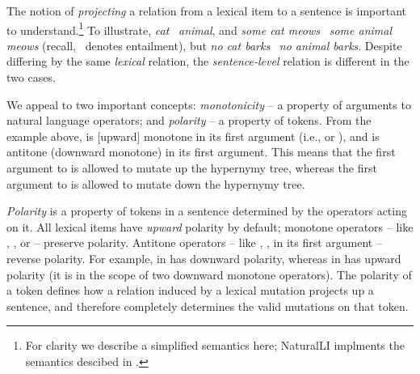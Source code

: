 %
%

The notion of \textit{projecting} a relation from a lexical item to
  a sentence is important to understand.\footnote{
    For clarity we describe a simplified semantics here; 
    NaturalLI implments the semantics descibed in 
    .
  }
To illustrate, \textit{cat} \forward\ \textit{animal},
  and \textit{some cat meows} \forward\ \textit{some animal meows}
  (recall, \forward\ denotes entailment),
  but
  \textit{no cat barks} \nforward\ \textit{no animal barks}.
Despite differing by the same \textit{lexical} relation,
  the \textit{sentence-level} relation is different in the two cases.

We appeal to two important concepts: \textit{monotonicity} -- a
  property of arguments to natural language operators;
  and \textit{polarity} -- a property of tokens.
From the example above,  is [upward] monotone in its first
  argument (i.e.,  or ), 
  and  is antitone (downward monotone) in its first argument.
This means that the first argument to  is allowed to mutate up the
  hypernymy tree, whereas the first argument to  is allowed to mutate
  down the hypernymy tree.

\textit{Polarity} is
  a property of tokens in a sentence determined by the
  operators acting on it.
All lexical items have \textit{upward} polarity by default;
  monotone operators -- like , , or  -- preserve polarity.
Antitone operators -- like , ,  in its first argument -- 
  reverse polarity.
For example,  in  has downward 
  polarity, whereas  in 
  has upward polarity
  (it is in the scope of two downward monotone operators).
The polarity of a token defines how a relation induced by a lexical mutation
  projects up a sentence, and therefore completely determines the valid mutations
  on that token.

